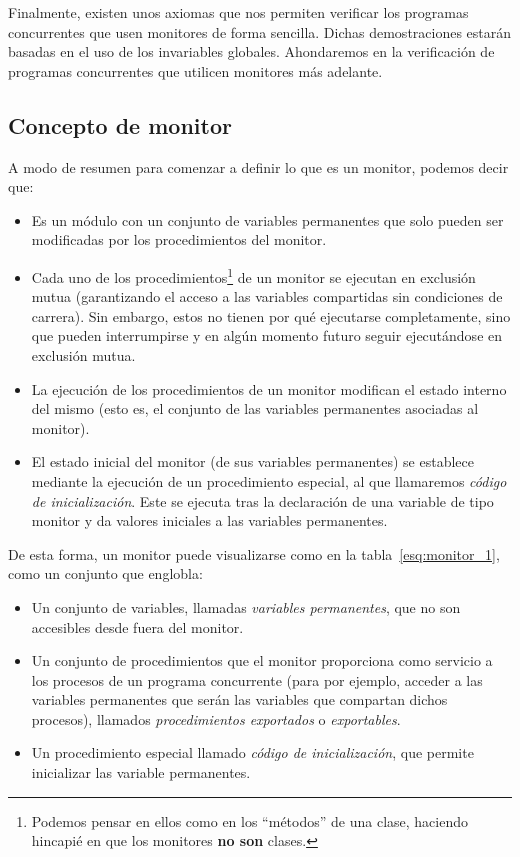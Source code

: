 Finalmente, existen unos axiomas que nos permiten verificar los programas concurrentes que usen monitores de forma sencilla. Dichas demostraciones estarán basadas en el uso de los invariables globales. Ahondaremos en la verificación de programas concurrentes que utilicen monitores más adelante.

\subsection{Concepto de monitor}
A modo de resumen para comenzar a definir lo que es un monitor, podemos decir que:
\begin{itemize}
    \item Es un módulo con un conjunto de variables permanentes que solo pueden ser modificadas por los procedimientos del monitor.
    \item Cada uno de los procedimientos\footnote{Podemos pensar en ellos como en los ``métodos'' de una clase, haciendo hincapié en que los monitores \textbf{no son} clases.} de un monitor se ejecutan en exclusión mutua (garantizando el acceso a las variables compartidas sin condiciones de carrera). Sin embargo, estos no tienen por qué ejecutarse completamente, sino que pueden interrumpirse y en algún momento futuro seguir ejecutándose en exclusión mutua.
    \item La ejecución de los procedimientos de un monitor modifican el estado interno del mismo (esto es, el conjunto de las variables permanentes asociadas al monitor).
    \item El estado inicial del monitor (de sus variables permanentes) se establece mediante la ejecución de un procedimiento especial, al que llamaremos \textit{código de inicialización}. Este se ejecuta tras la declaración de una variable de tipo monitor y da valores iniciales a las variables permanentes.
\end{itemize}
De esta forma, un monitor puede visualizarse como en la tabla~\ref{esq:monitor_1}, como un conjunto que englobla:
\begin{itemize}
    \item Un conjunto de variables, llamadas \textit{variables permanentes}, que no son accesibles desde fuera del monitor.
    \item Un conjunto de procedimientos que el monitor proporciona como servicio a los procesos de un programa concurrente (para por ejemplo, acceder a las variables permanentes que serán las variables que compartan dichos procesos), llamados \textit{procedimientos exportados} o \textit{exportables}.
    \item Un procedimiento especial llamado \textit{código de inicialización}, que permite inicializar las variable permanentes.
\end{itemize}

